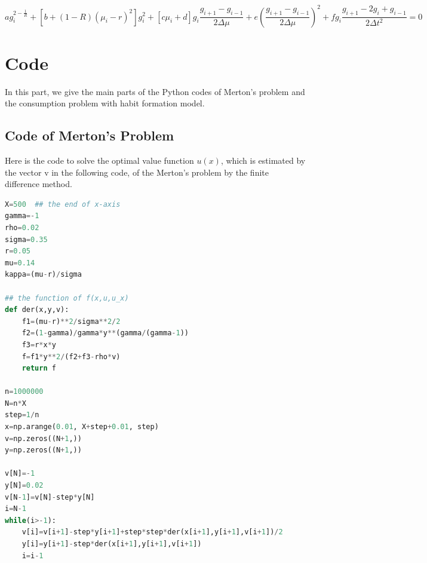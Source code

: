 \documentclass[a4paper]{article}
\theoremstyle{definition}
\numberwithin{equation}{section}
\begin{document}
$$ag_i^{2-\frac{1}{R}}+[b+(1-R)(\mu_i-r)^2]g_i^2+[c\mu_i+d]g_i\frac{g_{i+1}-g_{i-1}}{2\Delta\mu}+e(\frac{g_{i+1}-g_{i-1}}{2\Delta\mu})^2+fg_i\frac{g_{i+1}-2g_i+g_{i-1}}{2\Delta t^2}=0$$
\fi



\appendix
\section{Code}
In this part, we give the main parts of the Python codes of Merton's problem and the consumption problem with habit formation model.

\subsection{Code of Merton's Problem}
Here is the code to solve the optimal value function $u(x)$, which is estimated by the vector v in the following code, of the Merton's problem by the finite difference method.
\begin{lstlisting}[language=python]
X=500  ## the end of x-axis
gamma=-1
rho=0.02
sigma=0.35
r=0.05
mu=0.14
kappa=(mu-r)/sigma

## the function of f(x,u,u_x)
def der(x,y,v):
    f1=(mu-r)**2/sigma**2/2
    f2=(1-gamma)/gamma*y**(gamma/(gamma-1))
    f3=r*x*y
    f=f1*y**2/(f2+f3-rho*v)
    return f

n=1000000
N=n*X
step=1/n
x=np.arange(0.01, X+step+0.01, step)
v=np.zeros((N+1,))
y=np.zeros((N+1,))

v[N]=-1
y[N]=0.02
v[N-1]=v[N]-step*y[N]
i=N-1
while(i>-1):
    v[i]=v[i+1]-step*y[i+1]+step*step*der(x[i+1],y[i+1],v[i+1])/2
    y[i]=y[i+1]-step*der(x[i+1],y[i+1],v[i+1])
    i=i-1
\end{lstlisting}
\end{document}

